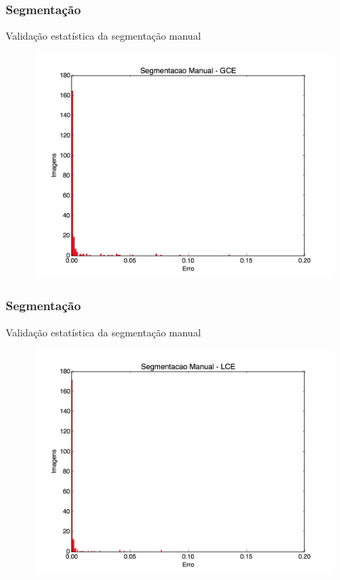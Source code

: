 \documentclass[t]{beamer}
\begin{document}
\begin{frame}[c]
	\frametitle{Segmentação}
	Validação estatística da segmentação manual
	\begin{figure}[h]
		\includegraphics[scale=0.18]{imgs/manual_gce}
	\end{figure}
\end{frame}

\begin{frame}[c]
	\frametitle{Segmentação}
	Validação estatística da segmentação manual
	\begin{figure}[h]
		\includegraphics[scale=0.18]{imgs/manual_lce}
	\end{figure}
\end{frame}
\end{document}
